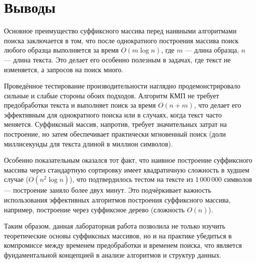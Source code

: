 \section{Выводы}

Основное преимущество суффиксного массива перед наивными алгоритмами поиска
заключается в том, что после однократного построения массива поиск любого
образца выполняется за время $O(m \log n)$, где $m$ — длина образца,
$n$ — длина текста. Это делает его особенно полезным
в задачах, где текст не изменяется, а запросов на поиск много.

Проведённое тестирование производительности наглядно продемонстрировало сильные и
слабые стороны обоих подходов. Алгоритм КМП не требует предобработки текста и выполняет
поиск за время $O(n + m)$, что делает его эффективным для однократного поиска или в случаях,
когда текст часто меняется. Суффиксный массив, напротив, требует значительных затрат на построение,
но затем обеспечивает практически мгновенный поиск (доли миллисекунды для текста длиной в миллион символов).

Особенно показательным оказался тот факт, что наивное построение суффиксного массива
через стандартную сортировку имеет квадратичную сложность в худшем случае ($O(n^2 \log n)$), что
подтвердилось тестом на тексте из 1\,000\,000 символов — построение заняло более двух минут.
Это подчёркивает важность использования эффективных алгоритмов построения суффиксного массива, например,
построение через суффиксное дерево (сложность $O(n)$).

Таким образом, данная лабораторная работа позволила не только изучить теоретические основы
суффиксных массивов, но и на практике убедиться в компромиссе между временем предобработки и
временем поиска, что является фундаментальной концепцией в анализе алгоритмов и структур данных.

\pagebreak